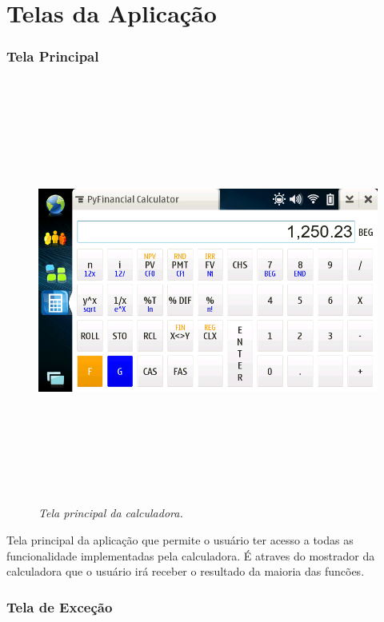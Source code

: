 \chapter{Telas da Aplicação}

\subsection{Tela Principal}

\begin{figure}[!h]
 \includegraphics[height = 14cm]{tela_principal.png}
 \caption{\it Tela principal da calculadora.} \label{tab:tela_principal}
\end{figure}

Tela principal da aplicação que permite o usuário ter acesso a todas as funcionalidade
implementadas pela calculadora. É atraves do mostrador da calculadora que o usuário irá
receber o resultado da maioria das funcões.


\subsection{Tela de Exceção}

